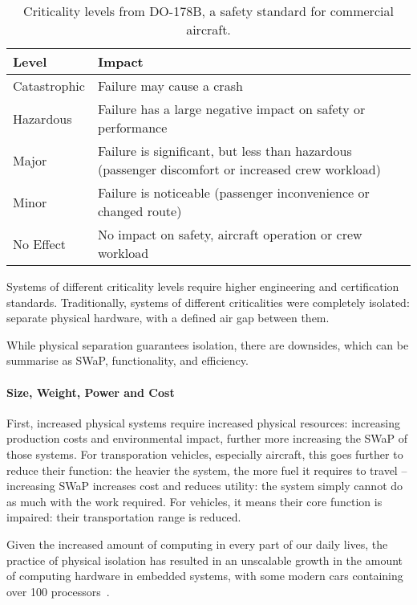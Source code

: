 \begin{table}
	\begin{center}
		\begin{tabular}{ | l | p{10cm} |} \hline
			\textbf{Level} & \textbf{Impact} \\ \hline
			Catastrophic   & Failure may cause a crash \\ \hline
			Hazardous      & Failure has a large negative impact on safety or performance \\ \hline
			Major          & Failure is significant, but less than hazardous (passenger discomfort or increased crew workload) \\ \hline 
			Minor          & Failure is noticeable (passenger inconvenience or changed route) \\ \hline
			No Effect      & No impact on safety, aircraft operation or crew workload \\ \hline
		\end{tabular}
		\caption{Criticality levels from DO-178B, a safety standard for commercial aircraft.}
		\label{tab:criticality_table}
	\end{center}   
\end{table}    

Systems of different criticality levels require higher engineering and certification standards.
Traditionally, systems of different criticalities were completely isolated: separate physical hardware, with a defined air gap between them. %

While physical separation guarantees isolation, there are downsides, which can be summarise as \gls{SWaP}, functionality, and efficiency.

\paragraph{Size, Weight, Power and Cost}

First, increased physical systems require increased physical resources: increasing production costs and environmental impact, further more increasing the \gls{SWaP} of those systems.
For transporation vehicles, especially aircraft, this goes further to reduce their function: the heavier the system, the more fuel it requires to travel -- increasing \gls{SWaP} increases cost and reduces utility: the system simply cannot do as much with the work required. 
For vehicles, it means their core function is impaired: their transportation range is reduced.

Given the increased amount of computing in every part of our daily lives, the practice of physical isolation has resulted in an unscalable growth in the amount of computing hardware in embedded systems, with some modern cars containing over 100 processors~\citep{Hergenhan_Heiser_08}.

